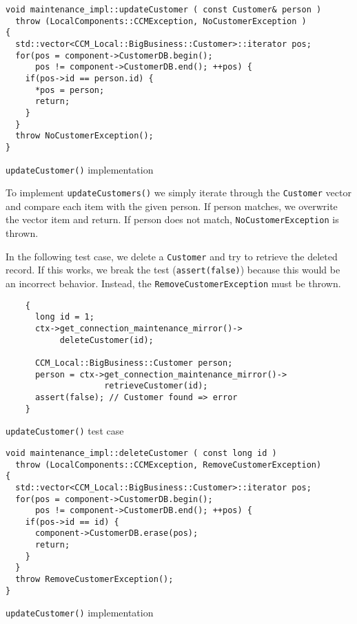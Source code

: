 \begin{Example}
\begin{minifbox}
\begin{small}
\begin{verbatim}
void maintenance_impl::updateCustomer ( const Customer& person )
  throw (LocalComponents::CCMException, NoCustomerException )
{
  std::vector<CCM_Local::BigBusiness::Customer>::iterator pos;
  for(pos = component->CustomerDB.begin(); 
      pos != component->CustomerDB.end(); ++pos) {
    if(pos->id == person.id) {
      *pos = person;
      return;
    }
  }
  throw NoCustomerException();  
}
\end{verbatim}
\end{small}
\end{minifbox}
\caption{{\tt updateCustomer()} implementation}
\label{example:}
\end{Example}

To implement {\tt updateCustomers()} we simply iterate through the {\tt Customer}
vector and compare each item with the given person.
If person matches, we overwrite the vector item and return.
If person does not match, {\tt NoCustomerException} is thrown.


\newpage
In the following test case, we delete a {\tt Customer} and try to retrieve the 
deleted record.
If this works, we break the test ({\tt assert(false)}) because this would be an
incorrect behavior. 
Instead, the {\tt RemoveCustomerException} must be thrown.
\begin{Example}
\begin{minifbox}
\begin{small}
\begin{verbatim}
    {
      long id = 1;
      ctx->get_connection_maintenance_mirror()->
           deleteCustomer(id);

      CCM_Local::BigBusiness::Customer person;
      person = ctx->get_connection_maintenance_mirror()->
                    retrieveCustomer(id);
      assert(false); // Customer found => error
    }
\end{verbatim}
\end{small}
\end{minifbox}
\caption{{\tt updateCustomer()} test case}
\label{example:}
\end{Example}


\begin{Example}
\begin{minifbox}
\begin{small}
\begin{verbatim}
void maintenance_impl::deleteCustomer ( const long id )
  throw (LocalComponents::CCMException, RemoveCustomerException)
{
  std::vector<CCM_Local::BigBusiness::Customer>::iterator pos;
  for(pos = component->CustomerDB.begin(); 
      pos != component->CustomerDB.end(); ++pos) {
    if(pos->id == id) {
      component->CustomerDB.erase(pos);
      return;
    }
  }
  throw RemoveCustomerException();  
}
\end{verbatim}
\end{small}
\end{minifbox}
\caption{{\tt updateCustomer()} implementation}
\label{example:}
\end{Example}

